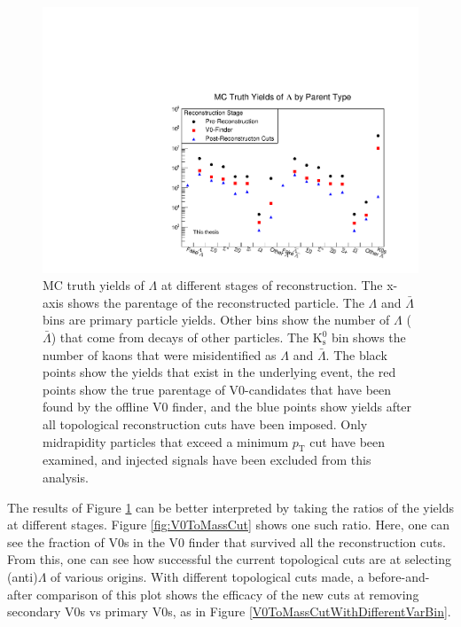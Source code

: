 \begin{figure}[hbtp]
\includegraphics[width=36pc]{Figures/2014-02-03-MCYields.pdf}
\caption[$\Lambda$ MC Yields at Different Reconstruction Stages]{
MC truth yields of $\Lambda$ at different stages of reconstruction.
The x-axis shows the parentage of the reconstructed particle. 
The $\Lambda$ and $\bar{\Lambda}$ bins are primary particle yields.  
Other bins show the number of $\Lambda$ ($\bar{\Lambda}$) that come from decays of other particles. 
The $\mathrm{K^0_s}$ bin shows the number of kaons that were misidentified as $\Lambda$ and $\bar{\Lambda}$.
The black points show the yields that exist in the underlying event, the red points show the true parentage of V0-candidates that have been found by the offline V0 finder, and the blue points show yields after all topological reconstruction cuts have been imposed.
Only midrapidity particles that exceed a minimum $p_\mathrm{T}$ cut have been examined, and injected signals have been excluded from this analysis.}
\label{fig:MCYields}
\end{figure}

The results of Figure \ref{fig:MCYields} can be better interpreted by taking the ratios of the yields at different stages.  
Figure \ref{fig:V0ToMassCut} shows one such ratio.  Here, one can see the fraction of V0s in the V0 finder that survived all the reconstruction cuts.  
From this, one can see how successful the current topological cuts are at selecting (anti)$\Lambda$ of various origins.  
With different topological cuts made, a before-and-after comparison of this plot shows the efficacy of the new cuts at removing secondary V0s vs primary V0s, as in Figure \ref{V0ToMassCutWithDifferentVarBin}.


